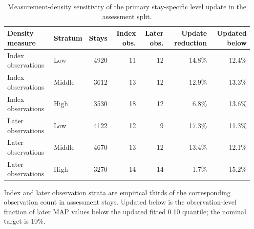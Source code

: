 \begin{table}[!htbp]
\caption{Measurement-density sensitivity of the primary stay-specific level update in the assessment split.}
\label{tab:measurement_density_sensitivity}
\centering
\begin{tabular}{llrrrrr}
\hline
Density measure & Stratum & Stays & Index obs. & Later obs. & Update reduction & Updated below\\
\hline
Index observations & Low & 4920 & 11 & 12 & 14.8\% & 12.4\%\\
Index observations & Middle & 3612 & 13 & 12 & 12.9\% & 13.3\%\\
Index observations & High & 3530 & 18 & 12 & 6.8\% & 13.6\%\\
Later observations & Low & 4122 & 12 & 9 & 17.3\% & 11.3\%\\
Later observations & Middle & 4670 & 13 & 12 & 13.4\% & 12.1\%\\
Later observations & High & 3270 & 14 & 14 & 1.7\% & 15.2\%\\
\hline
\end{tabular}
\par\smallskip
\footnotesize{Index and later observation strata are empirical thirds of the corresponding observation count in assessment stays. Updated below is the observation-level fraction of later MAP values below the updated fitted 0.10 quantile; the nominal target is 10\%.}
\end{table}
